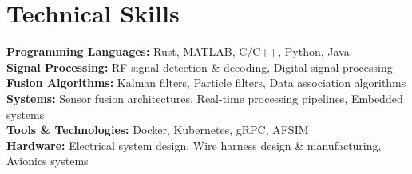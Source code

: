 \documentclass[letterpaper,11pt]{article}
\begin{document}
\section{Technical Skills}
\begin{itemize}[leftmargin=0.15in, label={}]
    \small{\item{
        \textbf{Programming Languages:} Rust, MATLAB, C/C++, Python, Java \\
        \textbf{Signal Processing:} RF signal detection \& decoding, Digital signal processing \\
        \textbf{Fusion Algorithms:} Kalman filters, Particle filters, Data association algorithms\\
        \textbf{Systems:} Sensor fusion architectures, Real-time processing pipelines, Embedded systems \\
        \textbf{Tools \& Technologies:} Docker, Kubernetes, gRPC, AFSIM\\
        \textbf{Hardware:} Electrical system design, Wire harness design \& manufacturing, Avionics systems
    }}
\end{itemize}


\end{document}
